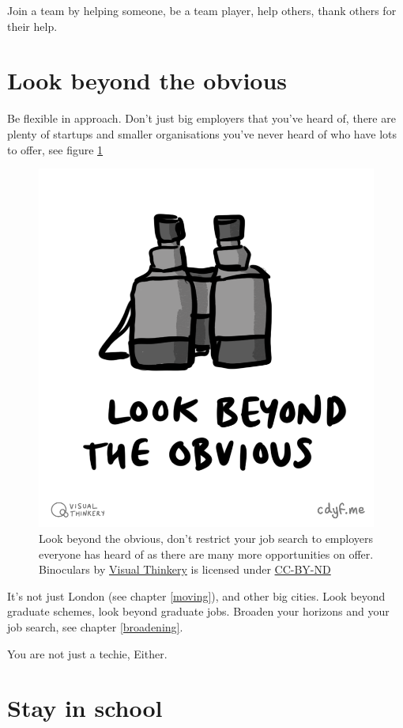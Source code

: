 \documentclass[
]{book}
\begin{document}
Join a team by helping someone, be a team player, help others, thank others for their help.

\hypertarget{beyond}{%
\section{Look beyond the obvious}\label{beyond}}

Be flexible in approach. Don't just big employers that you've heard of, there are plenty of startups and smaller organisations you've never heard of who have lots to offer, see figure \ref{fig:binoculars-fig}

\begin{figure}

{\centering \includegraphics[width=0.5\linewidth]{images/Look beyond the obvious} 

}

\caption{Look beyond the obvious, don't restrict your job search to employers everyone has heard of as there are many more opportunities on offer. Binoculars by \href{https://visualthinkery.com}{Visual Thinkery} is licensed under \href{https://creativecommons.org/licenses/by-nd/4.0/}{CC-BY-ND}}\label{fig:binoculars-fig}
\end{figure}



It's not just London (see chapter \ref{moving}), and other big cities. Look beyond graduate schemes, look beyond graduate jobs. Broaden your horizons and your job search, see chapter \ref{broadening}.

You are not just a techie, Either.

\hypertarget{lifelonglearning}{%
\section{Stay in school}\label{lifelonglearning}}
\end{document}
